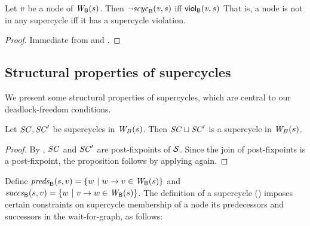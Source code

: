 \begin{proposition} \label{prop:scViol-iff-notInSC}
Let $\mathit{v}$ be a node of $\mathit{W}_{\mathsf{B}}({s})$. Then $\neg \mathit{scyc}_{\mathsf{B}}({\mathit{v}, s})$ iff $\mathsf{viol}_{\mathsf{B}}(\mathit{v},s)$ %
That is, a node is not in any supercycle iff it has a supercycle violation.
\end{proposition}
%
\begin{proof}
Immediate from  and .
\end{proof}








\subsection{Structural properties of supercycles}
\label{secn:supercycle-structural}


We present some structural properties of supercycles, which
are central to our deadlock-freedom conditions.


\begin{proposition} \label{prop:supercycle:union}
Let $\mathit{SC}, \mathit{SC}'$ be supercycles in $\mathit{W}_{B}({s})$. Then $\mathit{SC} \sqcup \mathit{SC}'$ is
a supercycle in $\mathit{W}_{B}({s})$.
\end{proposition}
%
\begin{proof}
By , $\mathit{SC}$ and $\mathit{SC}'$ are post-fixpoints of $\mathcal{S}$. Since the join of post-fixpoints is a post-fixpoint, 
the proposition follows by applying  again.
\end{proof}





Define
$\mathit{preds}_{\mathsf{B}}({s, v}) = \{ w ~|~ w \rightarrow v \in \mathit{W}_{\mathsf{B}}({s}) \}$ and 
$\mathit{succs}_{\mathsf{B}}({s, v}) = \{ w ~|~ v \rightarrow w \in \mathit{W}_{\mathsf{B}}({s}) \}$.
The definition of a supercycle () 
imposes certain constraints on supercycle membership of a node \wrt its predecessors and successors
in the wait-for-graph, as follows:


